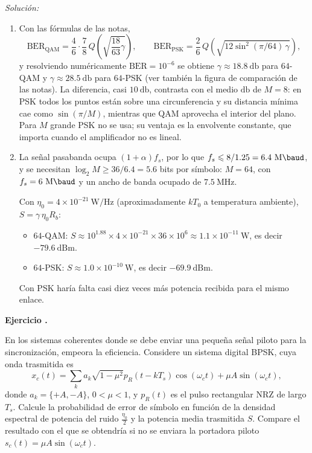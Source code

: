 \documentclass[a4paper,11pt]{article}
\newcounter{numejer}[section]
\newenvironment{ejercicio}[1][]{
\refstepcounter{numejer}
\noindent \large \textbf{Ejercicio \arabic{section}.\arabic{numejer}} \ifthenelse{\equal{#1}{}}{}{\emph{(#1)}}

\smallskip
}{
\bigskip
}
\newenvironment{solucion}[1][]{
\noindent \large \textsl{Solución:} \ifthenelse{\equal{#1}{}}{}{\emph{(#1)}}

\smallskip
}{
\bigskip
}
\begin{document}
\begin{solucion}
\begin{enumerate}
                \item Con las fórmulas de las notas,
                \begin{equation*}
                        \mathrm{BER}_{\text{QAM}}=\frac{4}{6}\cdot\frac78\,Q\left(\sqrt{\frac{18}{63}\gamma}\right),\qquad \mathrm{BER}_{\text{PSK}}=\frac26\,Q\left(\sqrt{12\sin^2(\pi/64)\,\gamma}\right),
                \end{equation*}
                y resolviendo numéricamente $\mathrm{BER}=10^{-6}$ se obtiene $\gamma\approx18.8\ \unit{\decibel}$ para $64$-QAM y $\gamma\approx28.5\ \unit{\decibel}$ para $64$-PSK (ver también la figura de comparación de las notas). La diferencia, casi $10\ \unit{\decibel}$, contrasta con el medio $\unit{\decibel}$ de $M=8$: en PSK todos los puntos están sobre una circunferencia y su distancia mínima cae como $\sin(\pi/M)$, mientras que QAM aprovecha el interior del plano. Para $M$ grande PSK no se usa; su ventaja es la envolvente constante, que importa cuando el amplificador no es lineal.
                \item La señal pasabanda ocupa $(1+\alpha)f_s$, por lo que $f_s\leqslant8/1.25=6.4\ \unit{\mega\baud}$, y se necesitan $\log_2M\geqslant36/6.4=5.6$ bits por símbolo: $M=64$, con $f_s=6\ \unit{\mega\baud}$ y un ancho de banda ocupado de $7.5\ \unit{\mega\hertz}$.

                Con $\eta_0=4\times10^{-21}\ \unit{\watt/\hertz}$ (aproximadamente $kT_0$ a temperatura ambiente), $S=\gamma\,\eta_0R_b$:
                \begin{itemize}
                        \item $64$-QAM: $S\approx10^{1.88}\times4\times10^{-21}\times36\times10^6\approx1.1\times10^{-11}\ \unit{\watt}$, es decir $-79.6\ \mathrm{dBm}$.
                        \item $64$-PSK: $S\approx1.0\times10^{-10}\ \unit{\watt}$, es decir $-69.9\ \mathrm{dBm}$.
                \end{itemize}
                Con PSK haría falta casi diez veces más potencia recibida para el mismo enlace.
        \end{enumerate}
\end{solucion}


\begin{ejercicio}
En los sistemas coherentes donde se debe enviar una pequeña señal piloto para la sincronización, empeora la eficiencia. Considere un sistema digital BPSK, cuya onda trasmitida es
\begin{equation*}
        x_c(t) = \sum_k a_k\sqrt{1-\mu^2}p_R(t-kT_s)\cos(\omega_c t)+\mu
        A\sin(\omega_c t),
\end{equation*}
donde $a_k=\{+A,-A\}$, $0<\mu<1$, y $p_R(t)$ es el pulso rectangular NRZ de largo $T_s$. Calcule la probabilidad de error de símbolo en función de la densidad espectral de potencia del ruido $\frac{\eta_0}{2}$ y la potencia media trasmitida $S$. Compare el resultado con el que se obtendría si no se enviara la portadora piloto $s_c(t)=\mu A\sin(\omega_c t)$.
\end{ejercicio}
\end{document}
